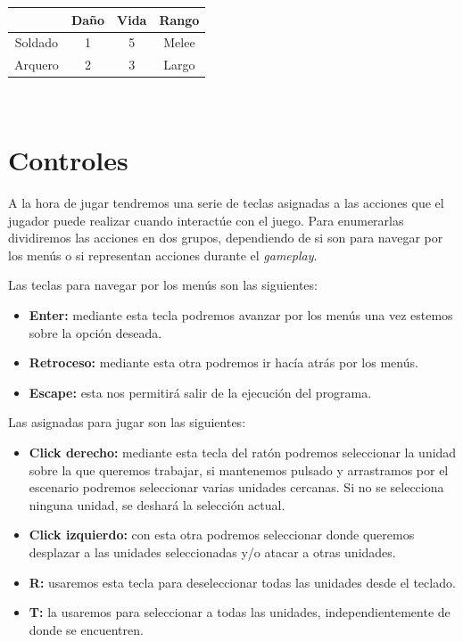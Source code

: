 \begin{center}
\begin{tabular}{|c|c|c|c|}%
\hline
        & Daño & Vida & Rango \\ 
\hline
\hline
Soldado & 1    & 5    & Melee \\ 
\hline
Arquero & 2    & 3    & Largo \\ 
\hline
\end{tabular}\\
\end{center}

\section{Controles}
A la hora de jugar tendremos una serie de teclas asignadas a las acciones que el
jugador puede realizar cuando interactúe con el juego. Para enumerarlas dividiremos las
acciones en dos grupos, dependiendo de si son para navegar por los menús o si
representan acciones durante el \textit{gameplay}.

Las teclas para navegar por los menús son las siguientes:

\begin{itemize}
	\item \textbf{Enter:} mediante esta tecla podremos avanzar por los menús una vez estemos sobre la opción deseada.
	\item \textbf{Retroceso:} mediante esta otra podremos ir hacía atrás por los menús.
	\item \textbf{Escape:} esta nos permitirá salir de la ejecución del programa.
\end{itemize}

Las asignadas para jugar son las siguientes:

\begin{itemize}
	\item \textbf{Click derecho:} mediante esta tecla del ratón podremos seleccionar la
	unidad sobre la que queremos trabajar, si mantenemos pulsado y arrastramos por el
	escenario podremos seleccionar varias unidades cercanas. Si no se selecciona ninguna
	unidad, se deshará la selección actual.
	\item \textbf{Click izquierdo:} con esta otra podremos seleccionar donde queremos
	desplazar a las unidades seleccionadas y/o atacar a otras unidades.
	\item \textbf{R:} usaremos esta tecla para deseleccionar todas las unidades desde
	el teclado.
	\item \textbf{T:} la usaremos para seleccionar a todas las unidades,
	independientemente de donde se encuentren.
\end{itemize}

